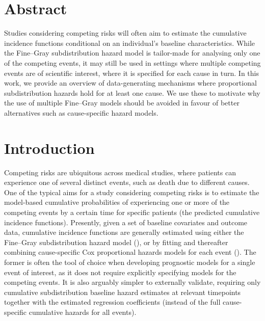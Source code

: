 \documentclass[
  letterpaper,
  paper=240mm:170mm,
  twoside=true,
  open=right,
  fontsize=10pt,
  pagesize=false,
  BCOR=15mm,
  DIV=14,
  headinclude=true,
  footinclude=false,
  headsepline=on]{scrbook}
\begin{document}
\clearpage

\section*{Abstract}\label{abstract-3}


Studies considering competing risks will often aim to estimate the
cumulative incidence functions conditional on an individual's baseline
characteristics. While the Fine--Gray subdistribution hazard model is
tailor-made for analysing only one of the competing events, it may still
be used in settings where multiple competing events are of scientific
interest, where it is specified for each cause in turn. In this work, we
provide an overview of data-generating mechanisms where proportional
subdistribution hazards hold for at least one cause. We use these to
motivate why the use of multiple Fine--Gray models should be avoided in
favour of better alternatives such as cause-specific hazard models.

\clearpage

\section{Introduction}\label{introduction-3}

Competing risks are ubiquitous across medical studies, where patients
can experience one of several distinct events, such as death due to
different causes. One of the typical aims for a study considering
competing risks is to estimate the model-based cumulative probabilities
of experiencing one or more of the competing events by a certain time
for specific patients (the predicted cumulative incidence functions).
Presently, given a set of baseline covariates and outcome data,
cumulative incidence functions are generally estimated using either the
Fine--Gray subdistribution hazard model
(),
or by fitting and thereafter combining cause-specific Cox proportional
hazards models for each event
(). The former is often the tool of choice when developing
prognostic models for a single event of interest, as it does not require
explicitly specifying models for the competing events. It is also
arguably simpler to externally validate, requiring only cumulative
subdistribution baseline hazard estimates at relevant timepoints
together with the estimated regression coefficients (instead of the full
cause-specific cumulative hazards for all events).
\end{document}
